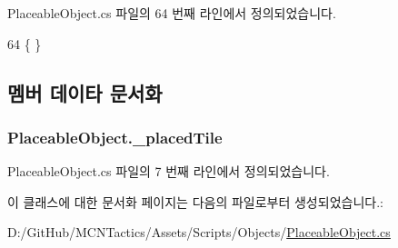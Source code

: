 Placeable\+Object.\+cs 파일의 64 번째 라인에서 정의되었습니다.


\begin{DoxyCode}
64 \{ \}
\end{DoxyCode}


\subsection{멤버 데이타 문서화}
\subsubsection[{\texorpdfstring{\+\_\+placed\+Tile}{_placedTile}}]{ Placeable\+Object.\+\_\+placed\+Tile\hspace{0.3cm}{\ttfamily [protected]}}\hypertarget{class_placeable_object_a0fd0566f0bb15c71b0630322762342d8}{}\label{class_placeable_object_a0fd0566f0bb15c71b0630322762342d8}


Placeable\+Object.\+cs 파일의 7 번째 라인에서 정의되었습니다.



이 클래스에 대한 문서화 페이지는 다음의 파일로부터 생성되었습니다.\+:\begin{DoxyCompactItemize}
\item 
D\+:/\+Git\+Hub/\+M\+C\+N\+Tactics/\+Assets/\+Scripts/\+Objects/\hyperlink{_placeable_object_8cs}{Placeable\+Object.\+cs}\end{DoxyCompactItemize}
